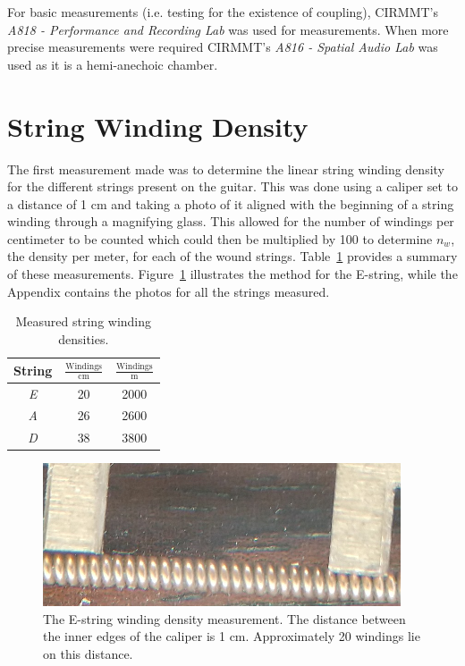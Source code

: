 \documentclass[../main.tex]{subfiles}
\begin{document}
For basic measurements (i.e. testing for the existence of coupling), CIRMMT's \emph{A818 - Performance and Recording Lab} was used for measurements. When more precise measurements were required CIRMMT's \emph{A816 - Spatial Audio Lab} was used as it is a hemi-anechoic chamber.

\section{String Winding Density}
The first measurement made was to determine the linear string winding density for the different strings present on the guitar. This was done using a caliper set to a distance of 1 cm and taking a photo of it aligned with the beginning of a string winding through a magnifying glass. This allowed for the number of windings per centimeter to be counted which could then be multiplied by 100 to determine $n_w$, the density per meter, for each of the wound strings. Table~\ref{tab:WindingDensities} provides a summary of these measurements. Figure~\ref{fig:EWindings} illustrates the method for the E-string, while the Appendix contains the photos for all the strings measured.

\begin{table}[h]
\centering
    \begin{tabular}{||c|| c| c||} 
        \hline
        String & $\frac{\text{Windings}}{\text{cm}}$ & $\frac{\text{Windings}}{\text{m}}$ \\ [0.5ex] 
        \hline
        \hline
        \emph{E} & 20 & 2000 \\ 
        \hline
        \emph{A} & 26 & 2600 \\
        \hline
        \emph{D} & 38 & 3800 \\ 
        \hline
    \end{tabular}
\caption{Measured string winding densities.}
\label{tab:WindingDensities}
\end{table}

\begin{figure}[h]
    \centering
    \includegraphics[scale=1]{./images/pictures/WindingsEZoom.png}
    \caption{The E-string winding density measurement. The distance between the inner edges of the caliper is 1 cm. Approximately 20 windings lie on this distance.}
    \label{fig:EWindings}
\end{figure}
\end{document}
